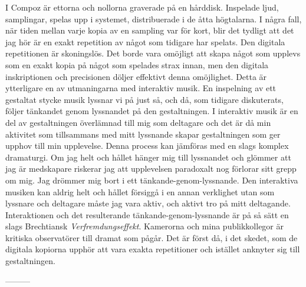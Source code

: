 \documentclass[12pt]{article}
\begin{document}
I Compoz är ettorna och nollorna graverade på en hårddisk. Inspelade ljud, samplingar, spelas upp i systemet, distribuerade i de åtta högtalarna. I några fall, när tiden mellan varje kopia av en sampling var för kort, blir det tydligt att det jag hör är en exakt repetition av något som tidigare har spelats. Den digitala repetitionen är skoningslös. Det borde vara omöjligt att skapa något som upplevs som en exakt kopia på något som spelades strax innan, men den digitala inskriptionen och precisionen döljer effektivt denna omöjlighet. Detta är ytterligare en av utmaningarna med interaktiv musik. En inspelning av ett gestaltat stycke musik lyssnar vi på just så, och då, som tidigare diskuterats, följer tänkandet genom lyssnandet på den gestaltningen. I interaktiv musik är en del av gestaltningen överlämnad till mig som deltagare och det är då min aktivitet som tillsammans med mitt lyssnande skapar gestaltningen som ger upphov till min upplevelse. Denna process kan jämföras med en slags komplex dramaturgi. Om jag helt och hållet hänger mig till lyssnandet och glömmer att jag är medskapare riskerar jag att upplevelsen paradoxalt nog förlorar sitt grepp om mig. Jag drömmer mig bort i ett tänkande-genom-lyssnande. Den interaktiva musiken kan aldrig helt och hållet försiggå i en annan verklighet utan som lyssnare och deltagare måste jag vara aktiv, och aktivt tro på mitt deltagande. Interaktionen och det resulterande tänkande-genom-lyssnande är på så sätt en slags Brechtiansk \emph{Verfremdungseffekt}. Kamerorna och mina publikkollegor är kritiska observatörer till dramat som pågår. Det är först då, i det skedet, som de digitala kopiorna upphör att vara exakta repetitioner och istället anknyter sig till gestaltningen.

---------
\end{document}
